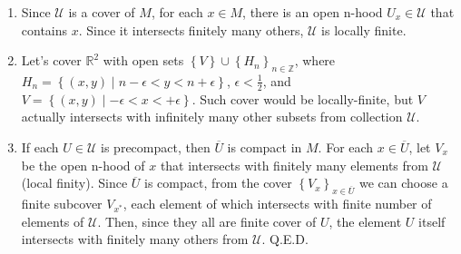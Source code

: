 \documentclass[a4paper]{article}
\begin{document}
\begin{exercise}[1-4]
\begin{enumerate}[label=(\alph*)]
    \item Since $\mathcal{U}$ is a cover of $M$, for each $x\in M$, there is an
        open n-hood $U_x \in \mathcal{U}$ that contains $x$. Since it intersects
        finitely many others, $\mathcal{U}$ is locally finite.
    \item Let's cover $\mathbb{R}^2$ with open sets
        $\left\{ V \right\} \cup \left\{ H_n \right\}_{n\in \mathbb{Z}}$, where
        $H_n = \left\{ (x, y) \mid n - \epsilon < y < n + \epsilon \right\}$,
        $\epsilon < \frac{1}{2}$, and
        $V = \left\{ (x, y) \mid - \epsilon < x < + \epsilon \right\}$.
        Such cover would be locally-finite, but $V$ actually intersects with
        infinitely many other subsets from collection $\mathcal{U}$.
    \item If each $U \in \mathcal{U}$ is precompact, then $\overline{U}$ is
        compact in $M$. For each $x \in \overline{U}$, let $V_x$ be the open
        n-hood of $x$ that intersects with finitely many elements from
        $\mathcal{U}$ (local finity). Since $\overline{U}$ is compact, from the
        cover $\left\{ V_x \right\}_{x \in \overline{U}}$ we can choose a finite
        subcover $V_{x^*}$, each element of which intersects with finite number
        of elements of $\mathcal{U}$. Then, since they all are finite cover of
        $U$, the element $U$ itself intersects with finitely many others from
        $\mathcal{U}$. Q.E.D.
\end{enumerate}
\end{exercise}
\end{document}
